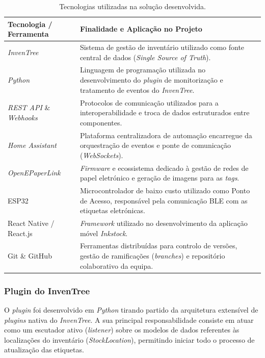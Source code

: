 \documentclass[10pt]{article}
\begin{document}
\begin{table}[H]
    \centering
    \begin{tabular}{|l|p{7cm}|}
         \hline
         \textbf{Tecnologia / Ferramenta} & \textbf{Finalidade e Aplicação no Projeto} \\ \hline
         \textit{InvenTree} & Sistema de gestão de inventário utilizado como fonte central de dados (\textit{Single Source of Truth}). \\ \hline
         \textit{Python} & Linguagem de programação utilizada no desenvolvimento do \textit{plugin} de monitorização e tratamento de eventos do \textit{InvenTree}. \\ \hline
         \textit{REST API} \& \textit{Webhooks} & Protocolos de comunicação utilizados para a interoperabilidade e troca de dados estruturados entre componentes. \\ \hline
         \textit{Home Assistant} & Plataforma centralizadora de automação encarregue da orquestração de eventos e ponte de comunicação (\textit{WebSockets}). \\ \hline
         \textit{OpenEPaperLink} & \textit{Firmware} e ecossistema dedicado à gestão de redes de papel eletrónico e geração de imagens para as \textit{tags}. \\ \hline
         ESP32 & Microcontrolador de baixo custo utilizado como Ponto de Acesso, responsável pela comunicação BLE com as etiquetas eletrónicas. \\ \hline
         React Native / React.js & \textit{Framework} utilizado no desenvolvimento da aplicação móvel \textit{Inkstock}. \\ \hline
         Git \& GitHub & Ferramentas distribuídas para controlo de versões, gestão de ramificações (\textit{branches}) e repositório colaborativo da equipa. \\ \hline
    \end{tabular}
    \caption{Tecnologias utilizadas na solução desenvolvida.}
    \label{tab:tecnologias}
\end{table}

\subsubsection{Plugin do InvenTree}

O \textit{plugin} foi desenvolvido em \textit{Python} tirando partido da arquitetura extensível de \textit{plugins} nativa do \textit{InvenTree}. A sua principal responsabilidade consiste em atuar como um escutador ativo (\textit{listener}) sobre os modelos de dados referentes às localizações do inventário (\textit{StockLocation}), permitindo iniciar todo o processo de atualização das etiquetas.
\end{document}
